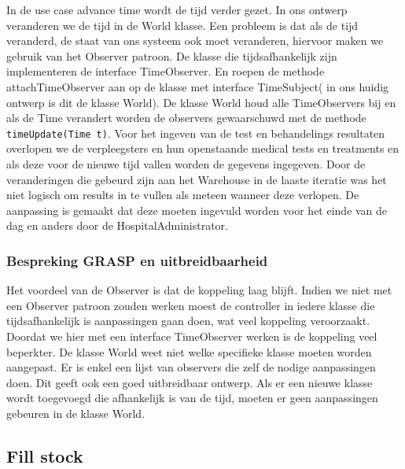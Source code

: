 \documentclass[a4paper]{article}
\begin{document}
In de use case advance time wordt de tijd verder gezet. In ons ontwerp veranderen we de tijd in de World klasse. Een probleem is dat als de tijd veranderd, de staat van ons systeem ook moet veranderen, hiervoor maken we gebruik van het Observer patroon. De klasse die tijdsafhankelijk zijn implementeren de interface TimeObserver. En roepen de methode attachTimeObserver aan op de klasse met interface TimeSubject( in ons huidig ontwerp is dit de klasse World). De klasse World houd alle TimeObservers bij en als de Time verandert worden de observers gewaarschuwd met de methode \texttt{timeUpdate(Time t)}. Voor het ingeven van de test  en behandelings resultaten overlopen we de verpleegsters en hun openstaande medical tests en treatments en als deze voor de nieuwe tijd vallen worden de gegevens ingegeven. Door de veranderingen die gebeurd zijn aan het Warehouse in de laaste iteratie was het niet logisch om results in te vullen als meteen wanneer deze verlopen. De aanpassing is gemaakt dat deze moeten ingevuld worden voor het einde van de dag en anders door de HospitalAdministrator.

\subsubsection{Bespreking GRASP en uitbreidbaarheid}

Het voordeel van de Observer is dat de koppeling laag blijft. Indien we niet met een Observer patroon zouden werken moest de controller in iedere klasse die tijdsafhankelijk is aanpassingen gaan doen, wat veel koppeling veroorzaakt. Doordat we hier met een interface TimeObserver werken is de koppeling veel beperkter. De klasse World weet niet welke specifieke klasse moeten worden aangepast. Er is enkel een lijst van observers die zelf de nodige aanpassingen doen. Dit geeft ook een goed uitbreidbaar ontwerp. Als er een nieuwe klasse wordt toegevoegd die afhankelijk is van de tijd, moeten er geen aanpassingen gebeuren in de klasse World. 

\subsection{Fill stock}
\end{document}
